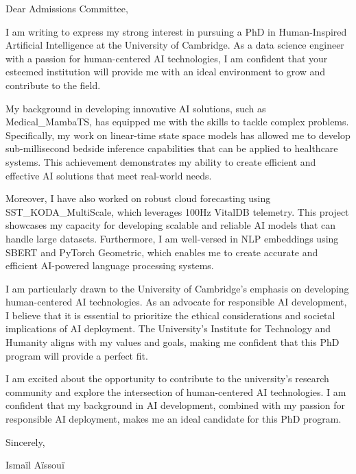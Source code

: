 \documentclass[11pt]{letter}
\begin{document}
\opening{Dear Admissions Committee,}

I am writing to express my strong interest in pursuing a PhD in Human-Inspired Artificial Intelligence at the University of Cambridge. As a data science engineer with a passion for human-centered AI technologies, I am confident that your esteemed institution will provide me with an ideal environment to grow and contribute to the field.

My background in developing innovative AI solutions, such as Medical_MambaTS, has equipped me with the skills to tackle complex problems. Specifically, my work on linear-time state space models has allowed me to develop sub-millisecond bedside inference capabilities that can be applied to healthcare systems. This achievement demonstrates my ability to create efficient and effective AI solutions that meet real-world needs.

Moreover, I have also worked on robust cloud forecasting using SST_KODA_MultiScale, which leverages 100Hz VitalDB telemetry. This project showcases my capacity for developing scalable and reliable AI models that can handle large datasets. Furthermore, I am well-versed in NLP embeddings using SBERT and PyTorch Geometric, which enables me to create accurate and efficient AI-powered language processing systems.

I am particularly drawn to the University of Cambridge's emphasis on developing human-centered AI technologies. As an advocate for responsible AI development, I believe that it is essential to prioritize the ethical considerations and societal implications of AI deployment. The University's Institute for Technology and Humanity aligns with my values and goals, making me confident that this PhD program will provide a perfect fit.

I am excited about the opportunity to contribute to the university's research community and explore the intersection of human-centered AI technologies. I am confident that my background in AI development, combined with my passion for responsible AI deployment, makes me an ideal candidate for this PhD program.

\closing{Sincerely,}
Ismaïl Aïssouï
\end{document}
